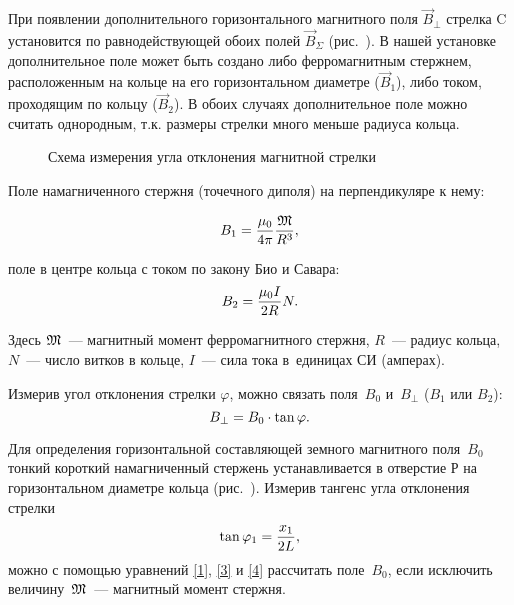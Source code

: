При появлении дополнительного горизонтального магнитного поля $\vec{B}_{\perp}$ стрелка C установится по равнодействующей
обоих полей $\vec{B}_{\Sigma}$ (рис.~). В нашей установке дополнительное поле может быть создано либо ферромагнитным
стержнем, расположенным на кольце на его горизонтальном диаметре ($\vec{B}_1$), либо током, проходящим по кольцу
($\vec{B}_2$). В обоих случаях дополнительное поле можно считать однородным, т.к. размеры стрелки много меньше радиуса
кольца.

\begin{wrapfigure}{r}{0.4\textwidth}
	\caption{Схема измерения угла отклонения магнитной стрелки}
\end{wrapfigure}

Поле намагниченного стержня (точечного диполя) на перпендикуляре к нему:

\begin{equation}
	\eqmark{1}
    B_1=\frac{\mu_0}{4\pi}\frac{\Mgot}{R^3},
\end{equation}

поле в центре кольца с током по закону Био и Савара:
\begin{equation}
	\eqmark{2}
    B_2=\frac{\mu_0 I}{2R}N.
\end{equation}

Здесь $\mathfrak M$~--- магнитный момент ферромагнитного стержня, $R$~--- радиус кольца, $N$~--- число витков в кольце,
$I$~--- сила тока в~единицах СИ (амперах).

Измерив угол отклонения стрелки $\varphi$, можно связать поля~$B_0$ и~$B_{\perp}$ ($B_1$ или $B_2$):
\begin{equation}
	\eqmark{3}
    B_{\perp}=B_0\cdot \tan{\varphi}.
\end{equation}


Для определения горизонтальной составляющей земного магнитного поля~$B_0$ тонкий короткий намагниченный стержень
устанавливается в отверстие Р на горизонтальном диаметре кольца (рис.~). Измерив тангенс угла отклонения стрелки
\begin{equation}
	\eqmark{4}
    \tan\varphi_1=\frac{x_1}{2L},
\end{equation}
можно с помощью уравнений \eqref{1}, \eqref{3} и \eqref{4} рассчитать поле~$B_0$, если исключить величину~$\mathfrak M$~--- магнитный
момент стержня.

